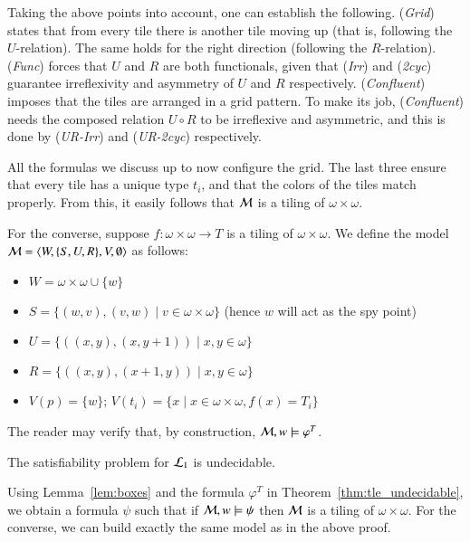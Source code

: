 \begin{pf}
Taking the above points into account, one can establish the
following. (\textit{Grid}) states that from every tile there is
another tile moving up (that is, following the $U$-relation). The
same holds for the right direction (following the $R$-relation).
(\textit{Func}) forces that $U$ and $R$ are both functionals, given
that (\textit{Irr}) and (\textit{2cyc}) guarantee irreflexivity and
asymmetry of $U$ and $R$ respectively. (\textit{Confluent}) imposes
that the tiles are arranged in a grid pattern. To make its job,
(\textit{Confluent}) needs the composed relation $U\circ R$ to be
irreflexive and asymmetric, and this is done by (\textit{UR-Irr})
and (\textit{UR-2cyc}) respectively.

All the formulas we discuss up to now configure the grid. The last
three ensure that every tile has a unique type $t_i$, and that the
colors of the tiles match properly. From this, it easily follows
that $\mathcal{M}$ is a tiling of $\omega\times\omega$.

For the converse, suppose $f:\omega\times\omega\to T$ is a tiling of
$\omega\times\omega$. We define the model
$\mathcal{M}=\langle W,\{S,U,R\},V,\emptyset \rangle$ as follows:
\begin{itemize}
\item $W=\omega\times\omega \cup \{w\}$
\item $S=\{(w,v),(v,w)\mid v\in\omega\times\omega\}$  (hence $w$ will act as the spy
point)
\item $U=\{((x,y),(x,y+1))\mid x,y\in\omega\}$
\item $R=\{((x,y),(x+1,y))\mid x,y\in\omega\}$
\item $V(p)=\{w\}$; $V(t_i)=\{x\mid x\in\omega\times\omega, f(x)=T_i\}$
\end{itemize}
The reader may verify that, by construction,
$\mathcal{M},w\models\varphi^T$.
\end{pf}


\begin{cor}
The satisfiability problem for {\em $\mathcal{L}_1$} is undecidable.
\end{cor}
%
\begin{pf}
Using Lemma~\ref{lem:boxes} and the formula $\varphi^T$ in Theorem~\ref{thm:tle_undecidable}, we obtain a formula $\psi$ such that if $\mathcal{M},w\models\psi$ then $\mathcal{M}$ is a tiling of $\omega \times \omega$. For the converse, we can build exactly the same model as in the above proof.
\end{pf}




